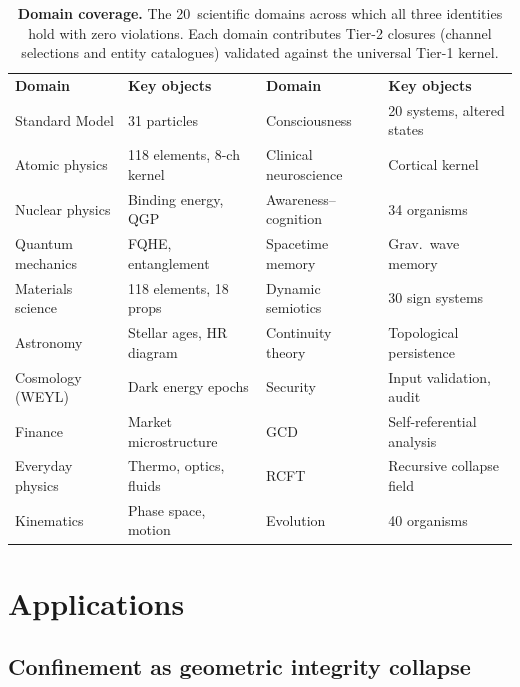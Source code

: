 \documentclass[
  aps,
  prx,
  twocolumn,
  superscriptaddress,
  nofootinbib,
  floatfix
]{revtex4-2}
\begin{document}
\begin{table}[!htbp]
\caption{\textbf{Domain coverage.} The 20~scientific domains
across which all three identities hold with zero violations.
Each domain contributes Tier-2 closures (channel selections and
entity catalogues) validated against the universal Tier-1 kernel.}
\label{tab:domains}
\begin{ruledtabular}
\begin{tabular}{llll}
\textbf{Domain} & \textbf{Key objects}
& \textbf{Domain} & \textbf{Key objects} \\
\colrule
Standard Model & 31 particles &
  Consciousness & 20 systems, altered states \\
Atomic physics & 118 elements, 8-ch kernel &
  Clinical neuroscience & Cortical kernel \\
Nuclear physics & Binding energy, QGP &
  Awareness--cognition & 34 organisms \\
Quantum mechanics & FQHE, entanglement &
  Spacetime memory & Grav.\ wave memory \\
Materials science & 118 elements, 18 props &
  Dynamic semiotics & 30 sign systems \\
Astronomy & Stellar ages, HR diagram &
  Continuity theory & Topological persistence \\
Cosmology (WEYL) & Dark energy epochs &
  Security & Input validation, audit \\
Finance & Market microstructure &
  GCD & Self-referential analysis \\
Everyday physics & Thermo, optics, fluids &
  RCFT & Recursive collapse field \\
Kinematics & Phase space, motion &
  Evolution & 40 organisms \\
\end{tabular}
\end{ruledtabular}
\end{table}

\section{Applications}

\subsection{Confinement as geometric integrity collapse}
\end{document}
